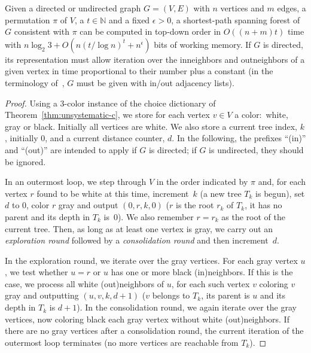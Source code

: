 \documentclass[envcountsame,envcountsect,undated,nolinenumbers]{lnthi}
\def\TbbbN{\mathbb{N}}
\begin{document}
\begin{theorem}
\label{thm:bfs}Given a directed or undirected graph $G=(V,E)$
with $n$ vertices and $m$ edges,
a permutation $\pi$ of $V$, a $t\in\TbbbN$
and a fixed $\epsilon>0$,
a shortest-path
spanning forest of $G$ consistent with $\pi$
can be computed in
top-down order in $O((n+m)t)$ time with
$n\log_2 3+O(n({t/{\log n}})^t+n^\epsilon)$ bits of working memory.
If $G$ is directed, its representation must
allow iteration over the inneighbors and
outneighbors of a given
vertex in time proportional to their number
plus a constant
(in the terminology
of~\cite{ElmHK15},
$G$ must be given with in/out adjacency lists).
\end{theorem}

\begin{proof}
Using a 3-color instance of the choice dictionary
of Theorem~\ref{thm:unsystematic-c},
we store for each vertex $v\in V$ a color:\
white, gray or black.
Initially all vertices are white.
We also store a current tree index, $k$,
initially 0, and a current distance counter, $d$.
In the following, the prefixes ``(in)'' and ``(out)''
are intended to apply if $G$ is directed;
if $G$ is undirected, they should be ignored.

In an outermost loop, we step through $V$ in
the order indicated by $\pi$ and,
for each vertex $r$ found to be white at this time,
increment~$k$
(a new tree $T_k$ is begun), set $d$ to 0,
color $r$ gray and output
$(0,r,k,0)$ ($r$ is the root $r_k$ of $T_k$, it
has no parent and its depth in $T_k$ is~$0$).
We also remember $r=r_k$
as the root
of the current tree.
Then, as long as at least one vertex is gray,
we carry out an \emph{exploration round}
followed by a \emph{consolidation round}
and then increment~$d$.

In the exploration round, we
iterate over the gray vertices.
For each gray vertex $u$, we test whether 
$u=r$ 
or
$u$ has one or more black (in)neighbors.
If this is the case, we
process all white (out)neighbors of $u$,
for each such vertex $v$
coloring $v$ gray and outputting $(u,v,k,d+1)$
($v$ belongs to $T_k$, its parent is $u$
and its depth in $T_k$ is $d+1$).
In the consolidation round, we again iterate
over the gray vertices, now coloring black each gray vertex
without white (out)neighbors.
If there are no gray vertices after a
consolidation round,
the current iteration of the outermost loop
terminates (no more vertices are reachable from $T_k$).


\end{proof}
\end{document}
